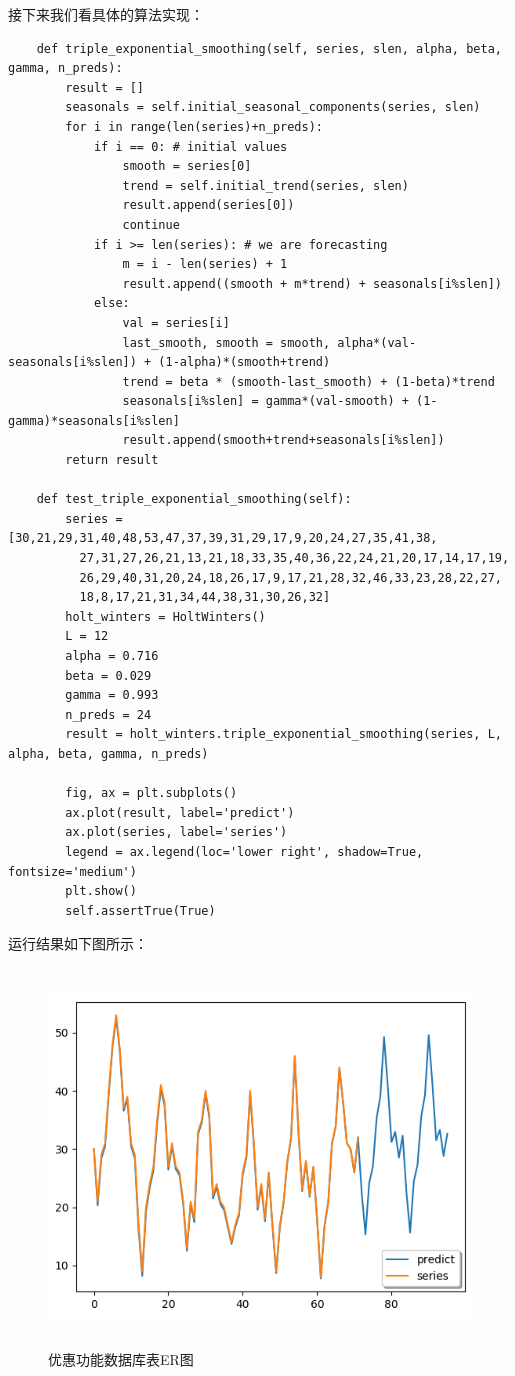 \documentclass{article}
\begin{document}
接下来我们看具体的算法实现：
\begin{lstlisting}
    def triple_exponential_smoothing(self, series, slen, alpha, beta, gamma, n_preds):
        result = []
        seasonals = self.initial_seasonal_components(series, slen)
        for i in range(len(series)+n_preds):
            if i == 0: # initial values
                smooth = series[0]
                trend = self.initial_trend(series, slen)
                result.append(series[0])
                continue
            if i >= len(series): # we are forecasting
                m = i - len(series) + 1
                result.append((smooth + m*trend) + seasonals[i%slen])
            else:
                val = series[i]
                last_smooth, smooth = smooth, alpha*(val-seasonals[i%slen]) + (1-alpha)*(smooth+trend)
                trend = beta * (smooth-last_smooth) + (1-beta)*trend
                seasonals[i%slen] = gamma*(val-smooth) + (1-gamma)*seasonals[i%slen]
                result.append(smooth+trend+seasonals[i%slen])
        return result
        
    def test_triple_exponential_smoothing(self):
        series = [30,21,29,31,40,48,53,47,37,39,31,29,17,9,20,24,27,35,41,38,
          27,31,27,26,21,13,21,18,33,35,40,36,22,24,21,20,17,14,17,19,
          26,29,40,31,20,24,18,26,17,9,17,21,28,32,46,33,23,28,22,27,
          18,8,17,21,31,34,44,38,31,30,26,32]
        holt_winters = HoltWinters()
        L = 12
        alpha = 0.716
        beta = 0.029
        gamma = 0.993
        n_preds = 24
        result = holt_winters.triple_exponential_smoothing(series, L, alpha, beta, gamma, n_preds)
        
        fig, ax = plt.subplots()
        ax.plot(result, label='predict')
        ax.plot(series, label='series')
        legend = ax.legend(loc='lower right', shadow=True, fontsize='medium')
        plt.show()
        self.assertTrue(True)
\end{lstlisting}
运行结果如下图所示：
\begin{figure}[H]
	\caption{优惠功能数据库表ER图}
	\label{f000072}
	\centering
	\includegraphics[height=10cm]{images/f000072}
\end{figure}
\end{document}
